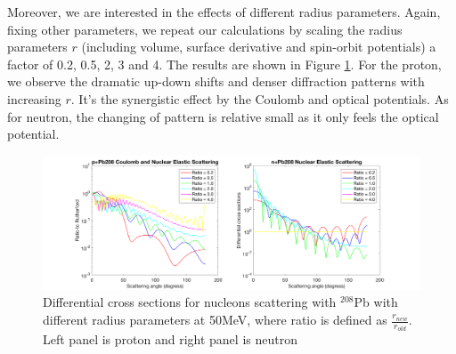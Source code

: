 \documentclass[12pt]{article}
\begin{document}
	Moreover, we are interested in the effects of different radius parameters. Again, fixing other parameters, we repeat our calculations by scaling the radius parameters $r$ (including volume, surface derivative and spin-orbit potentials) a factor of 0.2, 0.5, 2, 3 and 4. The results are shown in Figure \ref{fig:radiusparameter}. For the proton, we observe the dramatic up-down shifts and denser diffraction patterns with increasing $r$. It's the synergistic effect by the Coulomb and optical potentials. As for neutron, the changing of pattern is relative small as it only feels the optical potential. 
	
	
	\begin{figure}[t]
	\centering
	\includegraphics[width=1.0\textwidth]{7.png}
	\caption{Differential cross sections for nucleons scattering with $^{208}$Pb with different radius parameters at 50MeV, where ratio is defined as $\frac{r_{new}}{r_{old}}$. Left panel is proton and right panel is neutron  }
	\label{fig:radiusparameter}
	\end{figure}
	
\FloatBarrier



\end{document}
